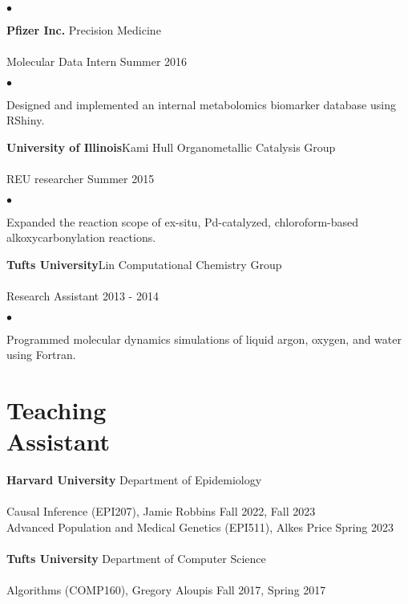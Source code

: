 \documentclass[margin,line]{res}
\newenvironment{list2}{
  \begin{list}{$\bullet$}{%
      \setlength{\itemsep}{0in}
      \setlength{\parsep}{0in} \setlength{\parskip}{0in}
      \setlength{\topsep}{0in} \setlength{\partopsep}{0in} 
      \setlength{\leftmargin}{0.2in}}}{\end{list}}
\begin{document}
\begin{resume}
\begin{list2}
\end{list2}
{\bf Pfizer Inc.} \hfill Precision Medicine\\
\vspace{-.3cm}\\
Molecular Data  Intern \hfill Summer 2016\\
\begin{list2}
\item Designed and implemented an internal metabolomics biomarker database using RShiny. 
\end{list2}
{\bf University of Illinois}\hfill Kami Hull Organometallic Catalysis Group\\
\vspace{-.3cm}\\
REU researcher \hfill Summer 2015\\
\begin{list2}
\item Expanded the reaction scope of ex-situ, Pd-catalyzed, chloroform-based alkoxycarbonylation reactions.
\end{list2}
{\bf Tufts University}\hfill Lin Computational Chemistry Group\\
\vspace{-.3cm}\\
Research Assistant \hfill  2013 - 2014\\
\begin{list2}
\item Programmed molecular dynamics simulations of liquid argon, oxygen, and water using Fortran.
\end{list2}
\newpage
\section{Teaching \\ Assistant}
{\bf Harvard University} \hfill Department of Epidemiology\\
\vspace{-.3cm}\\
Causal Inference (EPI207), Jamie Robbins \hfill Fall 2022, Fall 2023\\
Advanced Population and Medical Genetics  (EPI511), Alkes Price \hfill Spring 2023\\\\
{\bf Tufts University} \hfill Department of Computer Science\\
\vspace{-.3cm}\\
Algorithms (COMP160), Gregory Aloupis \hfill Fall 2017, Spring 2017

\end{resume}
\end{document}
